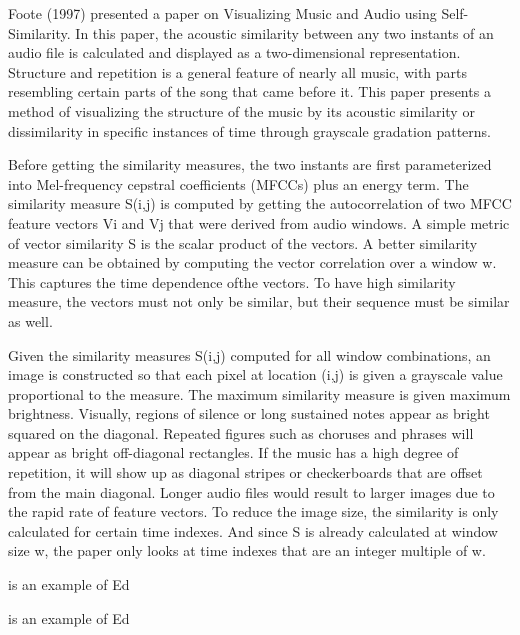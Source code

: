 	Foote (1997) presented a paper on Visualizing Music and Audio using Self-Similarity. In this paper, the acoustic similarity between any two instants of an audio file is calculated and displayed as a two-dimensional representation. Structure and repetition is a general feature of nearly all music, with parts resembling certain parts of the song that came before it. This paper presents a method of visualizing the structure of the music by its acoustic similarity or dissimilarity in specific instances of time through grayscale gradation patterns. 
	
	Before getting the similarity measures, the two instants  are first parameterized into Mel-frequency cepstral coefficients (MFCCs) plus an energy term. The similarity measure S(i,j) is computed by getting the autocorrelation of two MFCC feature vectors Vi and Vj that were derived from audio windows. A simple metric of vector similarity S is the scalar product of the vectors. A better similarity measure can be obtained by computing the vector correlation over a window w. This captures the time dependence ofthe vectors. To have high similarity measure, the vectors must not only be similar, but their sequence must be similar as well. 

	Given the similarity measures S(i,j) computed for all window combinations, an image is constructed so that each pixel at location (i,j) is given a grayscale value proportional to the measure. The maximum similarity measure is given maximum brightness. Visually, regions of silence or long sustained notes appear as bright squared on the diagonal. Repeated figures such as choruses and phrases will appear as bright off-diagonal rectangles. If the music has a high degree of repetition, it will show up as diagonal stripes or checkerboards that are offset from the main diagonal. Longer audio files would result to larger images due to the rapid rate of feature vectors. To reduce the image size, the similarity is only calculated for certain time indexes. And since S is already calculated at window size w, the paper only looks at time indexes that are an integer multiple of w.


\newpage
\cite{indiaConf} is an example of Ed

\cite{earth} is an example of Ed